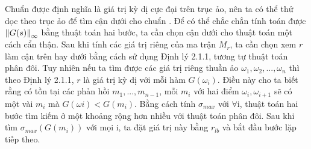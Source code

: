 Chuẩn \hinf được định nghĩa là giá trị kỳ dị cực đại trên trục ảo, nên ta có thể thử dọc theo trục ảo để tìm cận dưới cho chuẩn \hinf. Để có thể chắc chắn tính toán được $\norm{G(s)}_\infty$ bằng thuật toán hai bước, ta cần chọn cận dưới cho thuật toán một cách cẩn thận.
\newline
Sau khi tính các giá trị riêng của ma trận $M_r$, ta cần chọn xem $r$ làm cận trên hay dưới bằng cách sử dụng Định lý 2.1.1, tương tự thuật toán phân đôi. Tuy nhiên nếu ta tìm được các giá trị riêng thuần ảo $\omega_1, \omega_2,...,\omega_n$ thì theo Định lý 2.1.1, $r$ là giá trị kỳ dị với mỗi hàm $G(\omega_i)$. Điều này cho ta biết rằng có tồn tại các phản hồi $m_1, ..., m_{n-1}$, mỗi $m_i$ với hai điểm $\omega_i, \omega_{i+1}$ sẽ có một vài $m_i$ mà $G(\omega i) < G(m_i)$. Bằng cách tính $\sigma_{max}$ với $\forall$i, thuật toán hai bước tìm kiếm ở một khoảng rộng hơn nhiều với thuật toán phân đôi. Sau khi tìm $\sigma_{max}(G(m_i))$ với mọi i, ta đặt giá trị này bằng $r_{lb}$ và bắt đầu bước lặp tiếp theo.

